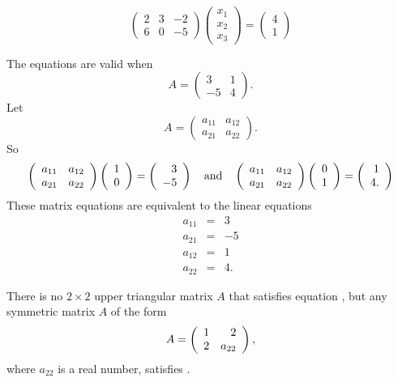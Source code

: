 \documentclass{ximera}
\begin{document}
\[
\left(\begin{array}{rrr} 2 & 3 & -2 \\ 6 & 0 & -5\end{array}\right) 
\left(\begin{array}{r} x_1 \\ x_2 \\ x_3\end{array}\right) = 
\left(\begin{array}{r} 4 \\ 1\end{array}\right)
\]

\ans The equations are valid when
\[ A = \left(\begin{array}{rr} 3 & 1 \\ -5 & 4\end{array}\right). \]
\soln Let
\[ A = \left(\begin{array}{rr} a_{11} & a_{12} \\ a_{21} & 
a_{22}\end{array}\right). \]
So
\[ \left(\begin{array}{rr} a_{11} & a_{12} \\ a_{21} & a_{22}\end{array}\right)
\left(\begin{array}{r} 1 \\ 0\end{array}\right) =
\left(\begin{array}{r} 3 \\ -5\end{array}\right) \quad\mbox{and}\quad
\left(\begin{array}{rr} a_{11} & a_{12} \\ a_{21} & a_{22}\end{array}\right)
\left(\begin{array}{r} 0 \\ 1\end{array}\right) =
\left(\begin{array}{r} 1 \\ 4.\end{array}\right) \]
These matrix equations are equivalent to the linear equations
\[ \begin{array}{rcl}
a_{11} & = & 3 \\
a_{21} & = & -5 \\
a_{12} & = & 1 \\
a_{22} & = & 4.\end{array} \]

\ans There is no $2 \times 2$ upper triangular matrix $A$ that
satisfies equation , but any symmetric matrix $A$ of the form
\[ A = \left(\begin{array}{rr} 1 & 2\\ 2 &a_{22}\end{array}\right), \]
where $a_{22}$ is a real number, satisfies .
\end{document}
